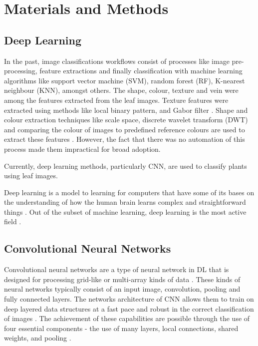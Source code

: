\documentclass[conference]{IEEEtran}
\begin{document}
\section{Materials and Methods}


\subsection{Deep Learning}\label{AA}

In the past, image classifications workflows consist of processes like image pre-processing, feature extractions and finally classification with machine learning algorithms like support vector machine (SVM), random forest (RF), K-nearest neighbour (KNN), amongst others. The shape, colour, texture and vein were among the features extracted from the leaf images. Texture features were extracted using methods like local binary pattern, and Gabor filter  \cite{guo2010completed, li2010selection}. Shape and colour extraction techniques like scale space, discrete wavelet transform (DWT) and comparing the colour of images to predefined reference colours are used to extract these features \cite{satpute2016color}. However, the fact that there was no automation of this process made them impractical for broad adoption.

Currently, deep learning methods, particularly CNN, are used to classify plants using leaf images.


Deep learning is a model to learning for computers that have some of its bases on the understanding of how the human brain learns complex and straightforward things \cite{wang2017origin}.
Out of the subset of machine learning, deep learning is the most active field \cite{angermueller2016deep}.

\subsection{Convolutional Neural Networks}
Convolutional neural networks are a type of neural network in DL that is designed for processing grid-like or multi-array kinds of data \cite{lecun2015deep,goodfellow2016deep}. These kinds of neural networks typically consist of an input image, convolution, pooling and fully connected layers. The networks architecture of CNN allows them to train on deep layered data structures at a fast pace and robust in the correct classification of images \cite{nielsen2015neural}. The achievement of these capabilities are possible through the use of four essential components - the use of many layers, local connections, shared weights, and pooling \cite{lecun2015deep}.
\end{document}
